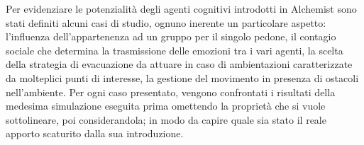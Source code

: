 Per evidenziare le potenzialità degli agenti cognitivi introdotti in Alchemist sono stati definiti alcuni casi di studio, ognuno inerente un particolare aspetto: l'influenza dell'appartenenza ad un gruppo per il singolo pedone, il contagio sociale che determina la trasmissione delle emozioni tra i vari agenti, la scelta della strategia di evacuazione da attuare in caso di ambientazioni caratterizzate da molteplici punti di interesse, la gestione del movimento in presenza di ostacoli nell'ambiente. \newline
Per ogni caso presentato, vengono confrontati i risultati della medesima simulazione eseguita prima omettendo la proprietà che si vuole sottolineare, poi considerandola; in modo da capire quale sia stato il reale apporto scaturito dalla sua introduzione. 




